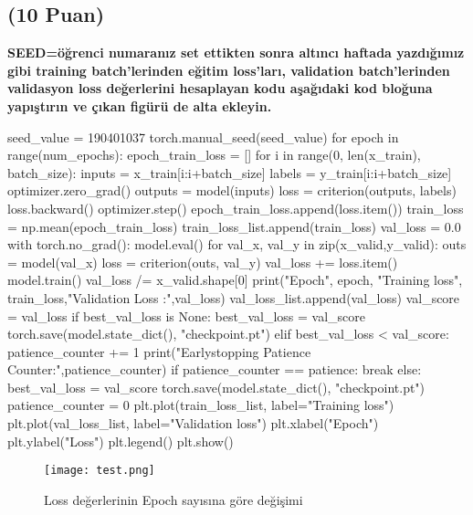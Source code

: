 \documentclass[11pt]{article}
\begin{document}
\subsection{(10 Puan)} \textbf{SEED=öğrenci numaranız set ettikten sonra altıncı haftada yazdığımız gibi training batch'lerinden eğitim loss'ları, validation batch'lerinden validasyon loss değerlerini hesaplayan kodu aşağıdaki kod bloğuna yapıştırın ve çıkan figürü de alta ekleyin.}

\begin{python}
seed_value = 190401037
torch.manual_seed(seed_value)
for epoch in range(num_epochs):
    epoch_train_loss = []
    for i in range(0, len(x_train), batch_size):
        inputs = x_train[i:i+batch_size]
        labels = y_train[i:i+batch_size]
        optimizer.zero_grad()
        outputs = model(inputs)
        loss = criterion(outputs, labels)
        loss.backward()
        optimizer.step()
        epoch_train_loss.append(loss.item())
    train_loss = np.mean(epoch_train_loss)
    train_loss_list.append(train_loss)
    val_loss = 0.0
    with torch.no_grad():
        model.eval()
        for val_x, val_y in zip(x_valid,y_valid):
            outs = model(val_x)
            loss = criterion(outs, val_y)
            val_loss += loss.item()
    model.train()
    val_loss /= x_valid.shape[0]
    print("Epoch", epoch, "Training loss", train_loss,"Validation Loss :",val_loss)
    val_loss_list.append(val_loss)
    val_score = val_loss
    if best_val_loss is None:
        best_val_loss = val_score
        torch.save(model.state_dict(), "checkpoint.pt")
    elif best_val_loss < val_score: 
        patience_counter += 1
        print("Earlystopping Patience Counter:",patience_counter)
        if patience_counter == patience:
            break
    else:
        best_val_loss = val_score
        torch.save(model.state_dict(), "checkpoint.pt") 
        patience_counter = 0
plt.plot(train_loss_list, label="Training loss")
plt.plot(val_loss_list, label="Validation loss")
plt.xlabel("Epoch")
plt.ylabel("Loss")
plt.legend()
plt.show()


\end{python}

\begin{figure}[ht!]
    \centering
    \texttt{[image: test.png]}
    \caption{Loss değerlerinin Epoch sayısına göre değişimi}
    \label{fig:my_pic}
\end{figure}
\end{document}
